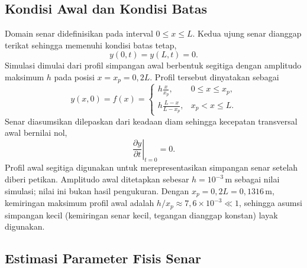 \documentclass[aps,prl,twocolumn,superscriptaddress]{revtex4-2}
\begin{document}
    \subsection{Kondisi Awal dan Kondisi Batas}

        Domain senar didefinisikan pada interval $0\leq x\leq L$.
        Kedua ujung senar dianggap terikat sehingga memenuhi kondisi batas tetap,
        \begin{equation}
            y(0,t)=y(L,t)=0.
            \label{eq:boundary-condition}
        \end{equation}
        Simulasi dimulai dari profil simpangan awal berbentuk segitiga dengan amplitudo maksimum $h$ pada posisi $x=x_p=0{,}2L$. 
        Profil tersebut dinyatakan sebagai
        \begin{equation}
            y(x,0)=f(x)=
            \begin{cases}
                h\displaystyle\frac{x}{x_p},
                & 0\leq x\leq x_p, \\[8pt]
                h\displaystyle\frac{L-x}{L-x_p},
                & x_p < x\leq L.
            \end{cases}
            \label{eq:initial-profile}
        \end{equation}
        Senar diasumsikan dilepaskan dari keadaan diam sehingga kecepatan transversal awal bernilai nol,
        \begin{equation}
            \left.\frac{\partial y}{\partial t}\right|_{t=0}
            =0.
            \label{eq:initial-velocity}
        \end{equation}
        Profil awal segitiga digunakan untuk merepresentasikan simpangan senar setelah diberi petikan. 
        Amplitudo awal ditetapkan sebesar $h=10^{-3}\,\mathrm{m}$ sebagai nilai simulasi; nilai ini bukan hasil pengukuran. 
        Dengan $x_p=0{,}2L=0{,}1316\,\mathrm{m}$, kemiringan maksimum profil awal adalah $h/x_p\approx7{,}6\times10^{-3}\ll1$, sehingga asumsi simpangan kecil (kemiringan senar kecil, tegangan dianggap konstan) layak digunakan.

    \subsection{Estimasi Parameter Fisis Senar}
    \label{sec:estimasi-parameter}
\end{document}
